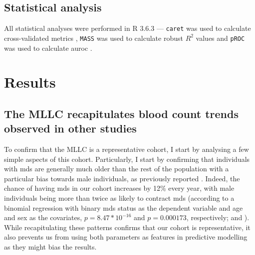 \subsection{Statistical analysis}

All statistical analyses were performed in R 3.6.3 \cite{R-core-team} --- \texttt{caret} was used to calculate cross-validated metrics \cite{Kuhn-2021-caret}, \texttt{MASS} was used to calculate robust $R^2$ values \cite{Venables-2002-mass} and \texttt{pROC} was used to calculate \ac{auroc} \cite{Robin-2011-proc}. 

\section{Results}

\subsection{The MLLC recapitulates blood count trends observed in other studies}

To confirm that the MLLC is a representative cohort, I start by analysing a few simple aspects of this cohort. Particularly, I start by confirming that individuals with \ac{mds} are generally much older than the rest of the population with a particular bias towards male individuals, as previously reported \cite{Rollison2008-yg}. Indeed, the chance of having \ac{mds} in our cohort increases by 12\% every year, with male individuals being more than twice as likely to contract \ac{mds} (according to a binomial regression with binary \ac{mds} status as the dependent variable and age and sex as the covariates, $p=8.47*10^{-16}$ and $p=0.000173$, respectively;  and ). While recapitulating these patterns confirms that our cohort is representative, it also prevents us from using both parameters as features in predictive modelling as they might bias the results.

\begin{figure}[!ht]
    \label{fig:mds-age}
\end{figure}

\begin{figure}[!ht]
    \label{fig:mds-sex}
\end{figure}

